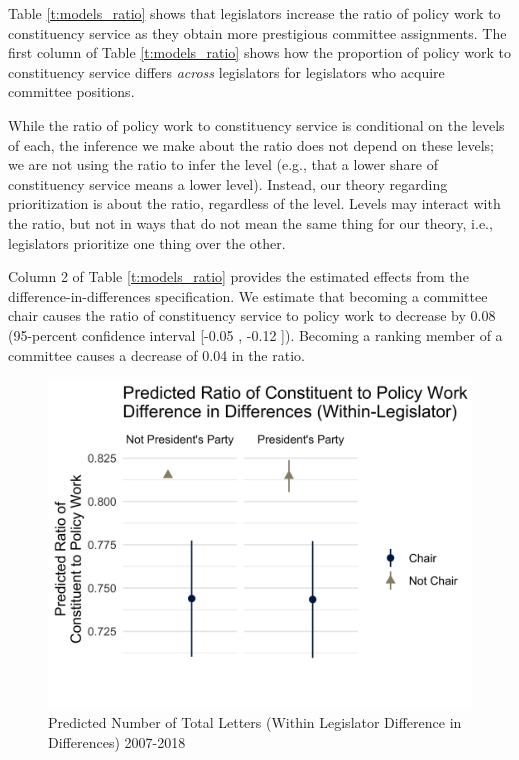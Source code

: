 \documentclass[12pt]{article}
\begin{document}
Table \ref{t:models_ratio} shows that legislators increase the ratio of policy work to constituency service as they obtain more 
prestigious committee assignments. The first column of Table \ref{t:models_ratio} shows how the proportion of policy work to constituency service differs \textit{across} legislators
for legislators who acquire committee positions. 

While the ratio of policy work to constituency service is conditional on the levels of each, the inference we make about the ratio does not depend on these levels; we are not using the ratio to infer the level (e.g., that a lower share of constituency service means a lower level). Instead, our theory regarding prioritization is about the ratio, regardless of the level. Levels may interact with the ratio, but not in ways that do not mean the same thing for our theory, i.e., legislators prioritize one thing over the other. 

Column 2 of Table \ref{t:models_ratio} provides the estimated effects from the difference-in-differences specification.
We estimate that becoming a committee chair causes the ratio of constituency service to policy work to decrease by 0.08 (95-percent confidence interval [-0.05 , -0.12 ]). Becoming a ranking member of a committee causes a decrease of 0.04 in the ratio.

\begin{figure}[hbt!]
\centering
\caption{Predicted Number of Total Letters (Within Legislator Difference in Differences) 2007-2018} \label{f:m-ratio-predicted}
\includegraphics[width = .8\textwidth]{figs/m-ratio-predicted-3}
\end{figure}
\end{document}
